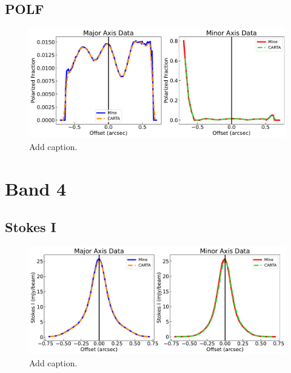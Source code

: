 \subsection{POLF}
\begin{figure}[h]
  \centering
  \includegraphics[width=1.1\textwidth]{WRITEUP_AND_IMAGES/IMAGES/IRS63_POLF_slice_BAND6.pdf}
  \caption{Add caption.}
  \label{fig: }
\end{figure}









\section{Band 4}
\subsection{Stokes I}
\begin{figure}[h]
  \centering
  \includegraphics[width=1.1\textwidth]{WRITEUP_AND_IMAGES/IMAGES/IRS63_StokesI_slice_BAND4.pdf}
  \caption{Add caption.}
  \label{fig: }
\end{figure}


